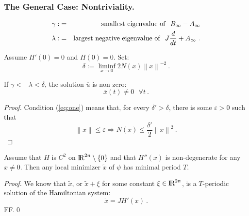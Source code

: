 \documentclass{llncs}
\begin{document}
%
\subsubsection{The General Case: Nontriviality.} %
\begin{eqnarray}
\gamma :&=&{\rm smallest\ eigenvalue\ of}\ \ B_{\infty} - A_{\infty} \\
   \lambda : &=& {\rm largest\ negative\ eigenvalue\ of}\ \
   J \frac{d}{dt} +A_{\infty}\ .
\end{eqnarray}

\begin{proposition}
Assume $H'(0)=0$ and $ H(0)=0$. Set:
\begin{equation}
   \delta := \liminf_{x\to 0} 2 N (x) \left\|x\right\|^{-2}\ .
   \label{eq:one}
\end{equation}

If $\gamma < - \lambda < \delta$,
the solution $\overline{u}$ is non-zero:
\begin{equation}
   \overline{x} (t) \ne 0\ \ \ \forall t\ .
\end{equation}
\end{proposition}
%
\begin{proof}
Condition (\ref{eq:one}) means that, for every $\delta ' > \delta$, there is some $\varepsilon > 0$ such that \begin{equation}
   \left\|x\right\| \le \varepsilon \Rightarrow N (x) \le
   \frac{\delta '}{2} \left\|x\right\|^{2}\ .
\end{equation}
\end{proof}

%

\begin{lemma}
Assume that $H$ is $C^{2}$ on ${\rm I\!R}^{2n} \setminus \{ 0\}$ and that $H'' (x)$ is non-de\-gen\-er\-ate for any $x\ne 0$. Then any local minimizer $\widetilde{x}$ of $\psi$ has minimal period $T$.
\end{lemma}
%
\begin{proof}
We know that $\widetilde{x}$, or
$\widetilde{x} + \xi$ for some constant $\xi \in {\rm I\!R}^{2n}$, is a $T$-periodic solution of the Hamiltonian system:
\begin{equation}
   \dot{x} = JH' (x)\ .
\end{equation}
FF.\qed \end{proof} 
\end{document}
